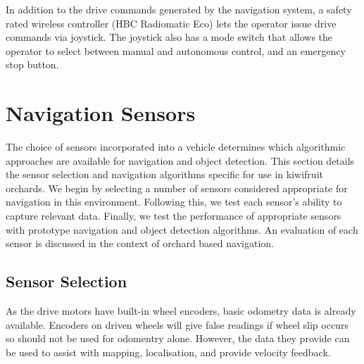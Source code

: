 \documentclass[preprint,authoryear,12pt]{elsarticle}
\begin{document}
        In addition to the drive commands generated by the navigation system, a safety rated wireless controller (HBC Radiomatic Eco) lets the operator issue drive commands via joystick.
        The joystick also has a mode switch that allows the operator to select between manual and autonomous control, and an emergency stop button.


\section{Navigation Sensors}
\label{sect:sensors}
    The choice of sensors incorporated into a vehicle determines which algorithmic approaches are available for navigation and object detection.
    This section details the sensor selection and navigation algorithms specific for use in kiwifruit orchards.
    We begin by selecting a number of sensors considered appropriate for navigation in this environment.
    Following this, we test each sensor's ability to capture relevant data.
    Finally, we test the performance of appropriate sensors with prototype navigation and object detection algorithms.
    An evaluation of each sensor is discussed in the context of orchard based navigation.

\subsection{Sensor Selection}

    As the drive motors have built-in wheel encoders, basic odometry data is already available.
    Encoders on driven wheels will give false readings if wheel slip occurs so should not be used for odomentry alone.
    However, the data they provide can be used to assist with mapping, localisation, and provide velocity feedback.
\end{document}
